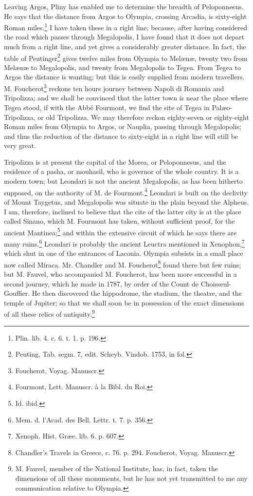 \documentclass[a4paper, 11pt, oneside, polutonikogreek, english]{article}
\begin{document}
Leaving Argos, Pliny has enabled me to determine the breadth of Peloponnesus. He says that the distance from Argos to Olympia, crossing Arcadia, is sixty-eight Roman miles.\footnote{Plin. lib. 4. c. 6. t. 1. p. 196.} I have taken these in a right line; because, after having considered the road which passes through Megalopolis, I have found that it does not depart much from a right line, and yet gives a considerably greater distance. In fact, the table of Peutinger\footnote{Peuting, Tab. segm. 7, edit. Scheyb. Vindob. 1753, in fol.} gives twelve miles from Olympia to Melænæ, twenty two from Melænæ to Megalopolis, and twenty from Megalopolis to Tegea. From Tegea to Argos the distance is wanting; but this is easily supplied from modern travellers. M. Foucherot\footnote{Foucherot, Voyag. Manuscr.} reckons ten hours journey between Napoli di Romania and Tripolizza; and we shall be convinced that the latter town is near the place where Tegea stood, if with the Abbé Fourmont, we find the site of Tegea in Palæo-Tripolizza, or old Tripolizza. We may therefore reckon eighty-seven or eighty-eight Roman miles from Olympia to Argos, or Nauplia, passing through Megalopolis; and thus the reduction of the distance to sixty-eight in a right line will still be very great.

Tripolizza is at present the capital of the Morea, or Peloponnesus, and the residence of a pasha, or mouhasil, who is governor of the whole country. It is a modern town; but Leondari is not the ancient Megalopolis, as has been hitherto supposed, on the authority of M. de Fourmont.\footnote{Fourmont, Lett. Manuscr. à la Bibl. du Roi.} Leondari is built on the declivity of Mount Taygetus, and Megalopolis was situate in the plain beyond the Alpheus. I am, therefore, inclined to believe that the cite of the latter city is at the place called Sinano, which M. Fourmont has taken, without sufficient proof, for the ancient Mantinea;\footnote{Id. ibid.} and within the extensive circuit of which he says there are many ruins.\footnote{Mem. d. l'Acad. des Bell. Lettr. t. 7. p. 356.} Leondari is probably the ancient Leuctra mentioned in Xenophon,\footnote{Xenoph. Hist. Græe. lib. 6. p. 607.} which shut in one of the entrances of Laconia. Olympia subsists in a small place now called Miraca. Mr. Chandler and M. Foucherot\footnote{Chandler's Travels in Greece, c. 76. p. 294. Foucherot, Voyag. Manuscr.} found there but few ruins; but M. Fauvel, who accompanied M. Foucherot, has been more successful in a second journey, which he made in 1787, by order of the Count de Choisseul-Gouffier. He then discovered the hippodrome, the stadium, the theatre, and the temple of Jupiter; so that we shall soon be in possession of the exact dimensions of all these relics of antiquity.\footnote{M. Fauvel, member of the National Institute, has, in fact, taken the dimensions of all these monuments, but he has not yet transmitted to me any communication relative to Olympia.}
\end{document}
